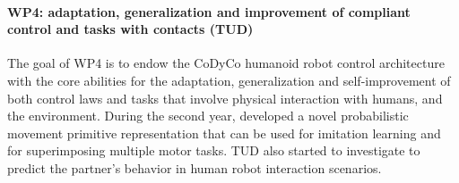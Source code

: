 

\paragraph*{WP4: adaptation, generalization and improvement of compliant control and tasks with contacts (TUD)}

The goal of WP4 is to endow the CoDyCo
humanoid robot control architecture with the
core abilities for the adaptation, generalization
and self-improvement of both control laws and
tasks that involve physical interaction with
humans, and the environment.
During the second year, developed a novel 
probabilistic movement primitive representation that
can be used for imitation learning and for superimposing multiple motor tasks. 
TUD also started to investigate to predict the partner's behavior in 
human robot interaction scenarios. 
